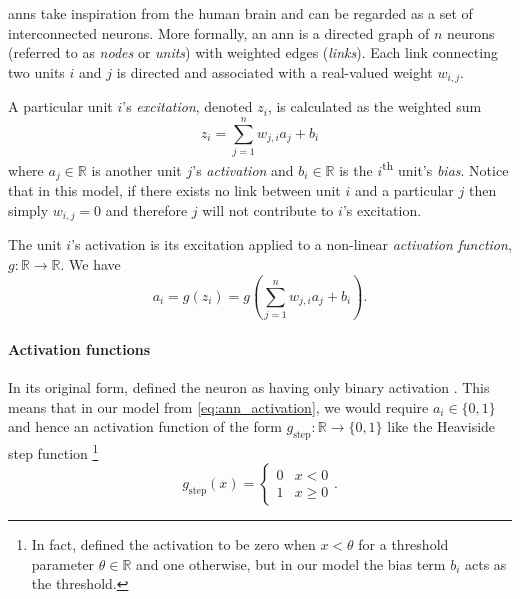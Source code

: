 \documentclass[../main.tex]{subfiles}
\begin{document}
\section{}
\label{sec:ann}
\Glspl{ann} take inspiration from the human brain and can be regarded as a set of interconnected neurons. 
More formally, an \gls{ann} is a directed graph of $n$ neurons (referred to as \emph{nodes} or \emph{units}) with weighted edges (\emph{links}).
Each link connecting two units $i$ and $j$ is directed and associated with a real-valued weight $w_{i,j}$. 

A particular unit $i$'s \emph{excitation}, denoted $z_i$, is calculated as the weighted sum
\begin{equation}
    z_i = \sum_{j=1}^n{w_{j,i} a_j} + b_i
\end{equation}
where $a_j \in \mathbb{R}$ is another unit $j$'s \emph{activation} and $b_i \in \mathbb{R}$ is the $i$\textsuperscript{th} unit's \emph{bias}.
Notice that in this model, if there exists no link between unit $i$ and a particular $j$ then simply $w_{i,j}=0$ and therefore $j$ will not contribute to $i$'s excitation. 

The unit $i$'s activation is its excitation applied to a non-linear \emph{activation function}, $g: \mathbb{R} \rightarrow \mathbb{R}$. We have
\begin{equation}
    \label{eq:ann_activation}
    a_i = g\left(z_i\right) = g\left(\sum_{j=1}^n{w_{j,i} a_j} + b_i\right).
\end{equation}

\paragraph{Activation functions}
In its original form, \citeauthor{mcculloch1943} defined the neuron as having only binary activation \cite*{mcculloch1943}. 
This means that in our model from \cref{eq:ann_activation}, we would require $a_i \in \{0, 1\}$ and hence an activation function of the form $g_\text{step}: \mathbb{R} \rightarrow \{0, 1\}$ like the Heaviside step function%
\footnote{In fact, \citeauthor{mcculloch1943} defined the activation to be zero when $x<\theta$ for a threshold parameter $\theta \in \mathbb{R}$ and one otherwise, but in our model the bias term $b_i$ acts as the threshold.}
\begin{equation*}
    \label{eq:step_activation}
    g_\text{step}(x) = \begin{cases} 
        0 & x < 0 \\
        1 & x \geq 0
    \end{cases}.
\end{equation*}
\end{document}
